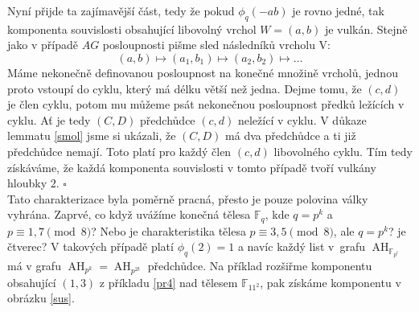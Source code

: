 \documentclass[12pt]{report}
\DeclareMathOperator{\AH}{AH}
\begin{document}


Nyní přijde ta zajímavější část, tedy že pokud $\phi_q(-ab)$ je rovno jedné, tak komponenta souvislosti obsahující libovolný vrchol $W=(a,b)$ je vulkán. Stejně jako v případě $AG$ posloupnosti pišme sled následníků vrcholu V:
$$(a,b)\longmapsto (a_1,b_1)\longmapsto (a_2, b_2) \longmapsto \dots$$
Máme nekonečně definovanou posloupnost na konečné množině vrcholů, jednou proto vstoupí do cyklu, který má délku větší než jedna. Dejme tomu, že $(c,d)$ je člen cyklu, potom mu můžeme psát nekonečnou posloupnost předků ležících v cyklu. Ať je tedy $(C,D)$ předchůdce $(c,d)$ neležící v cyklu. V důkaze lemmatu \ref{smol} jsme si ukázali, že $(C,D)$ má dva předchůdce a ti již předchůdce nemají. Toto platí pro každý člen $(c,d)$ libovolného cyklu. Tím tedy získáváme, že každá komponenta souvislosti v tomto případě tvoří vulkány hloubky $2$. \hfill $\square$\\
 

Tato charakterizace byla poměrně pracná, přesto je pouze polovina války vyhrána. Zaprvé, co když uvážíme konečná tělesa $\mathbb{F}_q$, kde $q = p^k$ a $p \equiv 1,7 \pmod{8}$? Nebo je charakteristika tělesa $p \equiv 3,5 \pmod{8}$, ale $q = p^k$? je čtverec? V takových případě platí $\phi_q(2)=1$ a navíc každý list v~grafu $\AH_{\mathbb{F}_{p^t}}$ má v grafu $\AH_{p^k} = \AH_{p^{2t}}$ předchůdce. Na příklad rozšiřme komponentu obsahující $(1,3)$ z příkladu \ref{pr4} nad tělesem $\mathbb{F}_{11^2}$, pak získáme komponentu v obrázku \ref{sus}.
\end{document}
